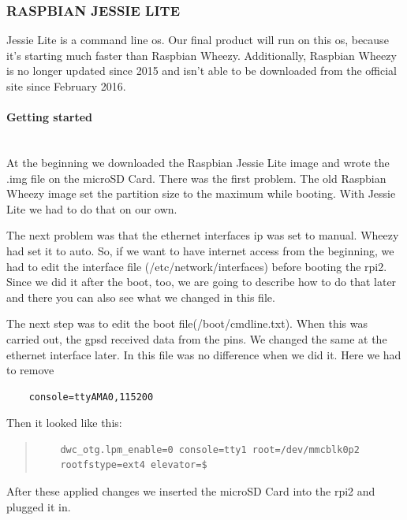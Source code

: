\subsubsection{RASPBIAN JESSIE LITE}
Jessie Lite is a command line \gls{os}. Our final product will run on this \gls{os}, because it's starting much faster than Raspbian Wheezy. Additionally, Raspbian Wheezy is no longer updated since 2015 and isn't able to be downloaded from the official site since February 2016.
\paragraph{Getting started} \mbox{}\\
At the beginning we downloaded the Raspbian Jessie Lite image and wrote the .img file on the microSD Card. There was the first problem. The old Raspbian Wheezy image set the partition size to the maximum while booting. With Jessie Lite we had to do that on our own. 

The next problem was that the ethernet interfaces \gls{ip} was set to manual. Wheezy had set it to auto. So, if we want to have internet access from the beginning, we had to edit the interface file (/etc/network/interfaces) before booting the \gls{rpi2}. Since we did it after the boot, too, we are going to describe how to do that later and there you can also see what we changed in this file.

The next step was to edit the boot file(/boot/cmdline.txt). When this was carried out, the \gls{gpsd} received data from the pins. We changed the same at the ethernet interface later. In this file was no difference when we did it. 
\newline \newline
Here we had to remove 
\begin{verbatim}
	console=ttyAMA0,115200
\end{verbatim}
Then it looked like this: 
\begin{quote}
\begin{verbatim}
	dwc_otg.lpm_enable=0 console=tty1 root=/dev/mmcblk0p2 
	rootfstype=ext4 elevator=$
\end{verbatim}
\end{quote}
After these applied changes we inserted the microSD Card into the \gls{rpi2} and plugged it in.
